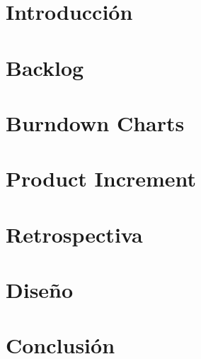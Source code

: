 \documentclass[10pt,a4paper]{article}
\begin{document}
\begin{comment}
\hline \hline
\multirow{3}{2cm}{Registrarme} & Crear entorno de programacion & 2 & \\ \cline{2-4}
& Verificar datos y agregarlos a la base de datos & 5 & \\ \cline{2-4}
& Crear interfaz grafica & 2 & 9\\ \cline{1-4}
\hline \hline
\multirow{3}{2cm}{Loguearme} & Crear entorno de programacion & 2 & \\ \cline{2-4}
& Verificar datos & 1 & \\ \cline{2-4}
& Crear interfaz grafica & 1 & 4\\ \cline{1-4}
\hline \hline
\multirow{3}{2cm}{Eliminar bar} & Crear entorno de programacion & 2 & \\ \cline{2-4}
& Verificar datos del bar& 1 & \\ \cline{2-4}
& Verificar datos del usuario& 1 & \\ \cline{2-4}
& Eliminar datos de la base de datos& 5 & \\ \cline{2-4}
& Crear interfaz grafica & 3 & 13\\ \cline{1-4}

\end{tabular}
\end{center}
\end{table}
\end{comment}

\section{Introducción}


\section{Backlog}


\section{Burndown Charts}


\section{Product Increment}


\section{Retrospectiva}


\section{Diseño}


\section{Conclusión}

\end{document}
